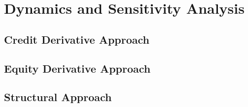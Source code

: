 \chapter{Dynamics and Sensitivity Analysis}

\section{Credit Derivative Approach}

\section{Equity Derivative Approach}

\section{Structural Approach}


